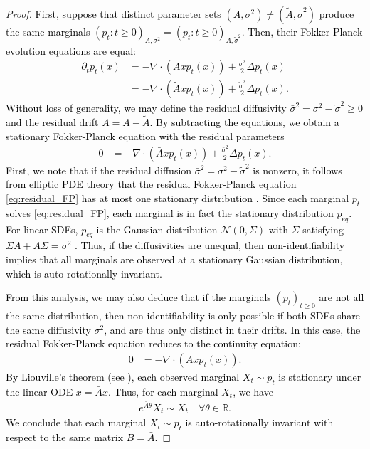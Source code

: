 \documentclass[twoside,11pt]{article}
\newcommand{\R} {\mathbb R}
\newcommand{\rv}[1]{\textcolor{black}{#1}}
\begin{document}
\begin{proof}
\rv{First, suppose that distinct parameter sets $(A,\sigma^2) \neq (\tilde{A},\tilde{\sigma}^2)$ produce the same marginals $(p_t: t \ge 0)_{A,\sigma^2} =  (p_t: t \ge 0)_{\tilde{A},\tilde{\sigma}^2}$. Then, their Fokker-Planck evolution equations are equal:
\begin{align*}
    \partial_t p_t(x) &= -\nabla \cdot (Ax p_t(x)) + \frac{\sigma^2}{2}\Delta p_t(x) \\
    &= -\nabla \cdot (\tilde{A}x p_t(x)) + \frac{\tilde{\sigma}^2}{2}\Delta p_t(x).
\end{align*}
Without loss of generality, we may define the residual diffusivity $\bar{\sigma}^2 = \sigma^2-\tilde{\sigma}^2 \ge 0$ and the residual drift $\bar{A} = A- \tilde{A}$. By subtracting the equations, we obtain a stationary Fokker-Planck equation with the residual parameters
\begin{align}
    0&= -\nabla \cdot (\bar{A}x p_t(x)) + \frac{\bar{\sigma}^2}{2}\Delta p_t(x).
    \label{eq:residual_FP}
\end{align}
First, we note that if the residual diffusion $\bar{\sigma}^2 = \sigma^2-\tilde{\sigma}^2$ is nonzero, it follows from elliptic PDE theory that the residual Fokker-Planck equation \eqref{eq:residual_FP} has at most one stationary distribution \citep[Theorem 4.1.6, Example 4.1.8]{bogachev2022fokker}. Since each marginal $p_t$ solves \eqref{eq:residual_FP}, each marginal is in fact the stationary distribution $p_{eq}$. For linear SDEs, $p_{eq}$ is the Gaussian distribution $\mathcal{N}(0, \Sigma)$ with $\Sigma$ satisfying $\Sigma A + A \Sigma = \sigma^2$ \citep[Theorem 6.2.1]{da1996ergodicity}. Thus, if the diffusivities are unequal, then non-identifiability implies that all marginals are observed at a stationary Gaussian distribution, which is auto-rotationally invariant.}

\rv{From this analysis, we may also deduce that if the marginals $(p_t)_{t \ge 0}$ are not all the same distribution, then non-identifiability is only possible if both SDEs share the same diffusivity $\sigma^2$, and are thus only distinct in their drifts. In this case, the residual Fokker-Planck equation reduces to the continuity equation:
\begin{align}
    0&= -\nabla \cdot (\bar{A}x p_t(x)).
\end{align}
By Liouville's theorem (see \citep[Theorem 1]{neklyudov2021deterministic}), each observed marginal $X_t \sim p_t$ is stationary under the linear ODE $\dot{x}=\bar{A}x$. Thus, for each marginal $X_t$, we have
\begin{align}
    e^{\bar{A}\theta}X_t \sim X_t \quad \forall \theta \in \R.
\end{align}
We conclude that each marginal $X_t \sim p_t$ is auto-rotationally invariant with respect to the same matrix $B=\bar{A}$.}
\end{proof}
\end{document}
